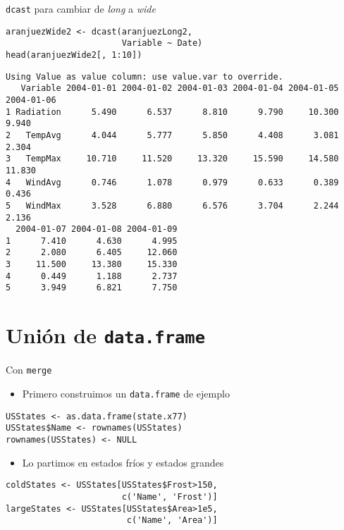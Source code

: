 \documentclass[xcolor={usenames,svgnames,dvipsnames}]{beamer}
\begin{document}
\begin{frame}[label={sec:orga2ac84f},fragile]{\texttt{dcast} para cambiar de \emph{long} a \emph{wide}}
 \lstset{language=r,label= ,caption= ,captionpos=b,numbers=none}
\begin{lstlisting}
aranjuezWide2 <- dcast(aranjuezLong2,
                       Variable ~ Date)
head(aranjuezWide2[, 1:10])
\end{lstlisting}

\begin{verbatim}
Using Value as value column: use value.var to override.
   Variable 2004-01-01 2004-01-02 2004-01-03 2004-01-04 2004-01-05 2004-01-06
1 Radiation      5.490      6.537      8.810      9.790     10.300      9.940
2   TempAvg      4.044      5.777      5.850      4.408      3.081      2.304
3   TempMax     10.710     11.520     13.320     15.590     14.580     11.830
4   WindAvg      0.746      1.078      0.979      0.633      0.389      0.436
5   WindMax      3.528      6.880      6.576      3.704      2.244      2.136
  2004-01-07 2004-01-08 2004-01-09
1      7.410      4.630      4.995
2      2.080      6.405     12.060
3     11.500     13.380     15.330
4      0.449      1.188      2.737
5      3.949      6.821      7.750
\end{verbatim}
\end{frame}


\section{Unión de \texttt{data.frame}}
\label{sec:org7576f53}
\begin{frame}[label={sec:org0c41244},fragile]{Con \texttt{merge}}
 \begin{itemize}
\item Primero construimos un \texttt{data.frame} de ejemplo
\end{itemize}
\lstset{language=r,label= ,caption= ,captionpos=b,numbers=none}
\begin{lstlisting}
USStates <- as.data.frame(state.x77)
USStates$Name <- rownames(USStates)
rownames(USStates) <- NULL
\end{lstlisting}

\begin{itemize}
\item Lo partimos en estados \guillemotleft{}fríos\guillemotright{} y estados \guillemotleft{}grandes\guillemotright{}
\end{itemize}
\lstset{language=r,label= ,caption= ,captionpos=b,numbers=none}
\begin{lstlisting}
coldStates <- USStates[USStates$Frost>150,
                       c('Name', 'Frost')]
largeStates <- USStates[USStates$Area>1e5,
                        c('Name', 'Area')]
\end{lstlisting}
\end{frame}
\end{document}
